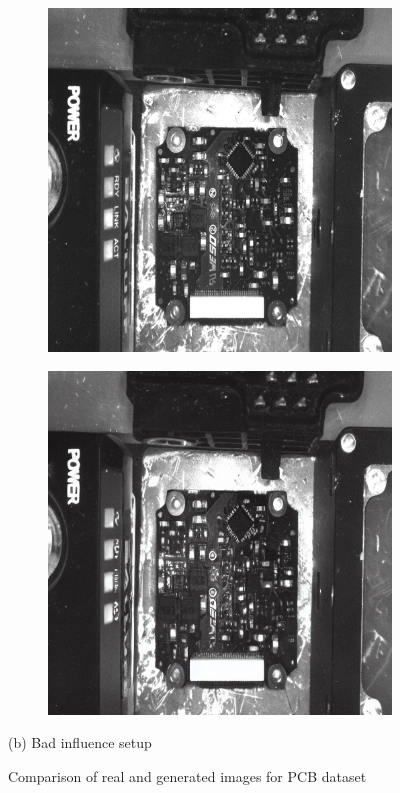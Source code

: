 \documentclass[12pt,DIV14,BCOR12mm,a4paper,footinclude=false,headinclude,parskip=half-,twoside,openright,cleardoublepage=empty,toc=index,bibliography=totoc,listof=totoc]{scrreprt}
\numberwithin{equation}{chapter}
\begin{document}
\begin{figure}
    \begin{subfigure}[t]{0.24\textwidth}
        \centering
        \includegraphics[width=\textwidth]{../media/diff_pcb_bad_real.png}
    \end{subfigure}%
    \hspace{0.02\textwidth}
    \begin{subfigure}[t]{0.24\textwidth}
        \centering
        \includegraphics[width=\textwidth]{../media/diff_pcb_bad_fake.png}
    \end{subfigure}
    \caption*{(b) Bad influence setup}

    \caption{Comparison of real and generated images for PCB dataset}
    \label{fig:generated_images_pcb}
\end{figure}
\end{document}
